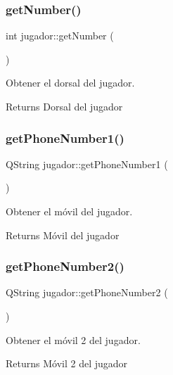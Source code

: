 \subsubsection{\texorpdfstring{get\+Number()}{getNumber()}}
{\footnotesize\ttfamily int jugador\+::get\+Number (\begin{DoxyParamCaption}{ }\end{DoxyParamCaption})}



Obtener el dorsal del jugador. 

\begin{DoxyReturn}{Returns}
Dorsal del jugador 
\end{DoxyReturn}
\mbox{\label{classjugador_a9bf1e0a307861344a0912d21ec4bf5a9}} 
\subsubsection{\texorpdfstring{get\+Phone\+Number1()}{getPhoneNumber1()}}
{\footnotesize\ttfamily Q\+String jugador\+::get\+Phone\+Number1 (\begin{DoxyParamCaption}{ }\end{DoxyParamCaption})}



Obtener el móvil del jugador. 

\begin{DoxyReturn}{Returns}
Móvil del jugador 
\end{DoxyReturn}
\mbox{\label{classjugador_aa6bbb640f9c687cebedcd442b96e5f76}} 
\subsubsection{\texorpdfstring{get\+Phone\+Number2()}{getPhoneNumber2()}}
{\footnotesize\ttfamily Q\+String jugador\+::get\+Phone\+Number2 (\begin{DoxyParamCaption}{ }\end{DoxyParamCaption})}



Obtener el móvil 2 del jugador. 

\begin{DoxyReturn}{Returns}
Móvil 2 del jugador 
\end{DoxyReturn}
\mbox{\label{classjugador_a03b468db718824916d7f6d47e46e708b}} 
